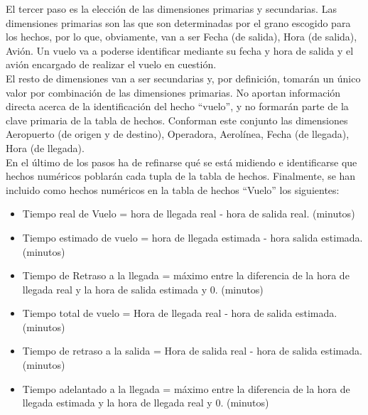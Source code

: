 \documentclass{article}
\begin{document}
El tercer paso es la elección de las dimensiones primarias y secundarias. Las dimensiones primarias son las que son determinadas por el grano escogido para los hechos, por lo que, obviamente, van a ser Fecha (de salida), Hora (de salida), Avión. Un vuelo va a poderse identificar mediante su fecha y hora de salida y el avión encargado de realizar el vuelo en cuestión.\\
El resto de dimensiones van a ser secundarias y, por definición, tomarán un único valor por combinación de las dimensiones primarias. No aportan información directa acerca de la identificación del hecho ``vuelo'', y no formarán parte de la clave primaria de la tabla de hechos. Conforman este conjunto las dimensiones Aeropuerto (de origen y de destino), Operadora, Aerolínea, Fecha (de llegada), Hora (de llegada).\\

En el último de los pasos ha de refinarse qué se está midiendo e identificarse que hechos numéricos poblarán cada tupla de la tabla de hechos. Finalmente, se han incluido como hechos numéricos en la tabla de hechos ``Vuelo'' los siguientes:

\begin{itemize}
    \item Tiempo real de Vuelo = hora de llegada real - hora de salida real. (minutos)
    \item Tiempo estimado de vuelo = hora de llegada estimada - hora salida estimada. (minutos)
    \item Tiempo de Retraso a la llegada = máximo entre la diferencia de la hora de llegada real y la hora de salida estimada y 0. (minutos)
    \item Tiempo total de vuelo = Hora de llegada real - hora de salida estimada. (minutos)
    \item Tiempo de retraso a la salida = Hora de salida real - hora de salida estimada. (minutos)
    \item Tiempo adelantado a la llegada = máximo entre la diferencia de la hora de llegada estimada y la hora de llegada real y 0. (minutos)
\end{itemize}
\end{document}

